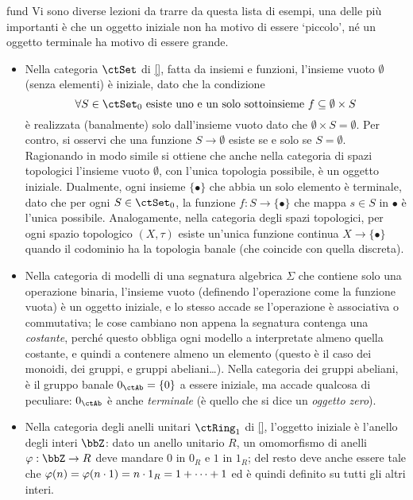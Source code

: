 \begin{hExamples}{fund}
	Vi sono diverse lezioni da trarre da questa lista di esempi, una delle più importanti è che un oggetto iniziale non ha motivo di essere `piccolo', né un oggetto terminale ha motivo di essere grande.
	\begin{itemize}
		\item Nella categoria \(\ctSet\) di \ref{}, fatta da insiemi e funzioni, l'insieme vuoto \(\emptyset\) (senza elementi) è iniziale, dato che la condizione
		      \[\forall S\in\ctSet_0 \text{ esiste uno e un solo sottoinsieme } f\subseteq \emptyset\times S \]
		      è realizzata (banalmente) solo dall'insieme vuoto dato che \(\emptyset\times S = \emptyset\). Per contro, si osservi che una funzione \(S \to \emptyset\) esiste se e solo se \(S=\emptyset\). Ragionando in modo simile si ottiene che anche nella categoria di spazi topologici l'insieme vuoto \(\emptyset\), con l'unica topologia possibile, è un oggetto iniziale. Dualmente, ogni insieme \(\{\bullet\}\) che abbia un solo elemento è terminale, dato che per ogni \(S\in\ctSet_0\), la funzione \(f : S \to \{\bullet\}\) che mappa \(s\in S\) in \(\bullet\) è l'unica possibile. Analogamente, nella categoria degli spazi topologici, per ogni spazio topologico \((X,\tau)\) esiste un'unica funzione continua \(X \to \{\bullet\}\) quando il codominio ha la topologia banale (che coincide con quella discreta).
		\item Nella categoria di modelli di una segnatura algebrica \(\Sigma\) che contiene solo una operazione binaria, l'insieme vuoto (definendo l'operazione come la funzione vuota) è un oggetto iniziale, e lo stesso accade se l'operazione è associativa o commutativa; le cose cambiano non appena la segnatura contenga una \emph{costante}, perché questo obbliga ogni modello a interpretate almeno quella costante, e quindi a contenere almeno un elemento (questo è il caso dei monoidi, dei gruppi, e gruppi abeliani\dots). Nella categoria dei gruppi abeliani, è il gruppo banale \(0_\ctAb=\{0\}\) a essere iniziale, ma accade qualcosa di peculiare: \(0_\ctAb\) è anche \emph{terminale} (è quello che si dice un \emph{oggetto zero}).
		\item Nella categoria degli anelli unitari \(\ctRing_1\) di \ref{}, l'oggetto iniziale è l'anello degli interi \(\bbZ\): dato un anello unitario \(R\), un omomorfismo di anelli \(\varphi : \bbZ \to R\) deve mandare \(0\) in \(0_R\) e \(1\) in \(1_R\); del resto deve anche essere tale che \(\varphi(n) = \varphi(n\cdot 1) = n \cdot 1_R = \iter[1][+]1\) ed è quindi definito su tutti gli altri interi.

\end{itemize}
\end{hExamples}
